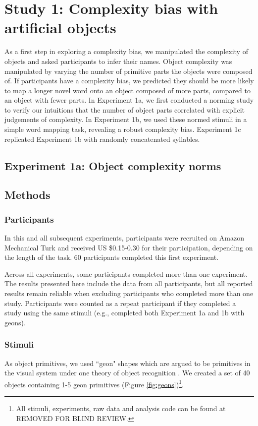 \documentclass[man]{apa2}
\begin{document}
\section{Study 1: Complexity bias with artificial objects} 
 As a first step in exploring a complexity bias, we manipulated the complexity of objects and asked participants to infer their names. Object complexity was manipulated by varying the number of primitive parts the objects were composed of. If participants have  a complexity bias, we predicted they should be more likely to map a longer novel word onto an object composed of more parts, compared to an object with fewer parts. In Experiment 1a, we first conducted a norming study to verify our intuitions that the number of object parts correlated with explicit judgements of complexity. In Experiment 1b, we  used these normed stimuli in a simple word mapping task, revealing a robust complexity bias. Experiment 1c replicated Experiment 1b with randomly concatenated syllables. 
   
\subsection{\textbf{Experiment 1a: Object complexity norms}}
\subsection{Methods}

\subsubsection{Participants} In this and all subsequent experiments, participants were recruited on Amazon Mechanical Turk and received US \$0.15-0.30 for their participation, depending on the length of the task. 60 participants completed this first experiment. 

Across all experiments, some participants completed more than one experiment. The results presented here include the data from all participants, but all reported results remain reliable when excluding participants who completed more than one study. Participants were counted as a repeat participant if they completed a study using the same stimuli (e.g., completed both Experiment 1a and 1b with geons).

\subsubsection{Stimuli}
As object primitives, we used ``geon" shapes which are argued to be primitives in the visual system under one theory of object recognition  \cite{biederman1987}. We created a set of 40 objects containing 1-5 geon primitives (Figure \ref{fig:geons})\footnote{All stimuli, experiments, raw data and analysis code can be found at REMOVED FOR BLIND REVIEW.}.
\end{document}
